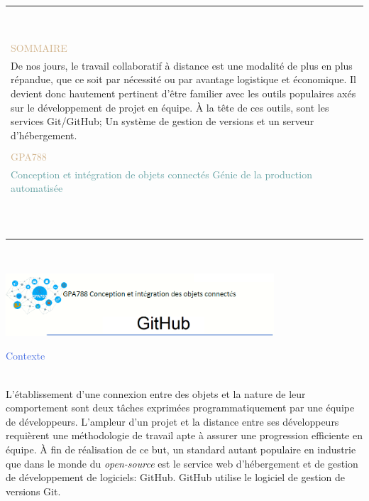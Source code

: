 \documentclass{article}
\begin{document}
\begin{minipage}{0.4\textwidth}
\begin{tabular}{|p{\textwidth}}
\\\\\\\\\\\\\\\\\\\\
\Large{\textcolor{Tan}{SOMMAIRE}}\\
De nos jours, le travail collaboratif à distance est une modalité de plus en plus répandue, que ce soit par nécessité ou par avantage logistique et économique. Il devient donc hautement pertinent d'être familier avec les outils populaires axés sur le développement de projet en équipe. À la tête de ces outils, sont les services Git/GitHub; Un système de gestion de versions et un serveur d'hébergement.\\\\
\Large{\textcolor{Tan}{GPA788}} \\
\textcolor{CadetBlue}{Conception et intégration de objets connectés Génie de la production automatisée}
\\\\\\\\\\\\\\\\\\\\\\\\
\end{tabular}
\end{minipage}%

\newpage
\

\newpage

\includegraphics[width=0.75\textwidth, left]{Header}

\begin{flushleft}
    \begin{Large}{\textcolor{RoyalBlue}{Contexte}}\end{Large}\\
    L'établissement d'une connexion entre des objets et la nature de leur comportement sont deux tâches exprimées programmatiquement par une équipe de développeurs. L'ampleur d'un projet et la distance entre ses développeurs requièrent une méthodologie de travail apte à assurer une progression efficiente en équipe. À fin de réalisation de ce but, un standard autant populaire en industrie que dans le monde du \textit{open-source} est le service web d'hébergement et de gestion de développement de logiciels: GitHub. GitHub utilise le logiciel de gestion de versions Git.
\end{flushleft}
\end{document}
